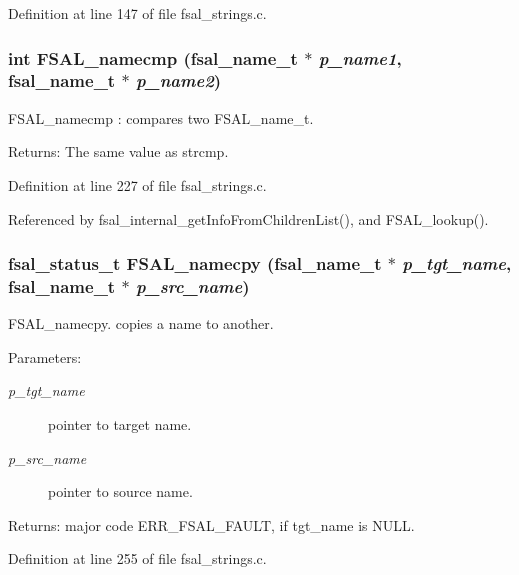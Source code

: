 Definition at line 147 of file fsal\_\-strings.c.
\subsubsection[{FSAL\_\-namecmp}]{\setlength{\rightskip}{0pt plus 5cm}int FSAL\_\-namecmp (fsal\_\-name\_\-t $\ast$ {\em p\_\-name1}, \/  fsal\_\-name\_\-t $\ast$ {\em p\_\-name2})}\label{group__FSALNameFunctions_g65950d02300f232113af9a073f86dd84}


FSAL\_\-namecmp : compares two FSAL\_\-name\_\-t.

\begin{Desc}
\item[Returns:]The same value as strcmp. \end{Desc}


Definition at line 227 of file fsal\_\-strings.c.

Referenced by fsal\_\-internal\_\-getInfoFromChildrenList(), and FSAL\_\-lookup().
\subsubsection[{FSAL\_\-namecpy}]{\setlength{\rightskip}{0pt plus 5cm}fsal\_\-status\_\-t FSAL\_\-namecpy (fsal\_\-name\_\-t $\ast$ {\em p\_\-tgt\_\-name}, \/  fsal\_\-name\_\-t $\ast$ {\em p\_\-src\_\-name})}\label{group__FSALNameFunctions_gb88a56ced82037a6ab91c312993a501a}


FSAL\_\-namecpy. copies a name to another.

\begin{Desc}
\item[Parameters:]
\begin{description}
\item[{\em p\_\-tgt\_\-name}]pointer to target name. \item[{\em p\_\-src\_\-name}]pointer to source name. \end{description}
\end{Desc}
\begin{Desc}
\item[Returns:]major code ERR\_\-FSAL\_\-FAULT, if tgt\_\-name is NULL. \end{Desc}


Definition at line 255 of file fsal\_\-strings.c.
